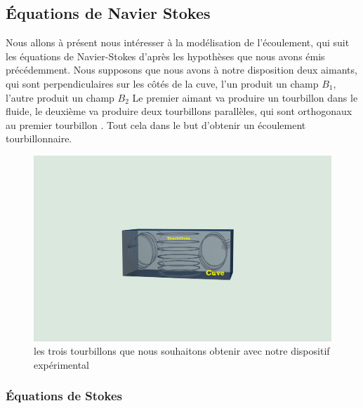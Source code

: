 \documentclass[a4paper,12pt,titlepage]{report}
\begin{document}
\begin{onehalfspace}
\chapter{Équations de  Navier Stokes} 
Nous allons à présent nous intéresser à la modélisation de l'écoulement, qui suit les équations de Navier-Stokes d'après les hypothèses que nous avons émis précédemment. 
Nous supposons que nous avons à notre disposition deux aimants, qui sont perpendiculaires sur les côtés de la cuve, l'un produit un champ $B_1$, l'autre produit un champ $B_2$
Le premier aimant va produire un tourbillon dans le fluide, le deuxième va produire deux tourbillons parallèles, qui sont orthogonaux au premier tourbillon . Tout cela dans le but d'obtenir un écoulement tourbillonnaire. 
\begin{figure}[!h]
\begin{center}
\includegraphics[height = 8 cm, keepaspectratio]{graphes/3_tourbillons.png}
\caption{les trois tourbillons que nous souhaitons obtenir avec notre dispositif expérimental}
\label{figure 1}
\end{center}
\end{figure}
\newpage
\subsection{Équations de Stokes}


\end{onehalfspace}
\end{document}
